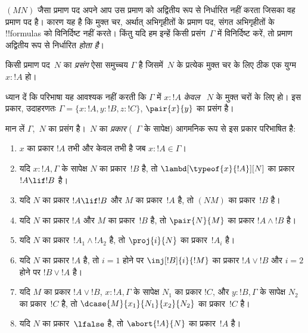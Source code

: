 \documentclass[../../../include/open-logic-section]{subfiles}
\begin{document}


$(MN)$ जैसा प्रमाण पद अपने आप उस प्रमाण को अद्वितीय रूप से निर्धारित नहीं
करता जिसका वह प्रमाण पद है। कारण यह है कि मुक्त चर, अर्थात् अभिगृहीतों के
प्रमाण पद, संगत अभिगृहीतों के !!{formula}s को विनिर्दिष्ट नहीं करते। किंतु यदि
हम इन्हें किसी प्रसंग~$\Gamma$ में विनिर्दिष्ट करें, तो प्रमाण अद्वितीय रूप से
निर्धारित \emph{होता है}।

\begin{defn}
किसी प्रमाण पद~$N$ का \emph{प्रसंग} ऐसा समुच्चय $\Gamma$ है जिसमें~$N$ के
प्रत्येक मुक्त चर के लिए ठीक एक युग्म $x : !A$ हो।
\end{defn}

ध्यान दें कि परिभाषा यह आवश्यक नहीं करती कि $\Gamma$ में $x:!A$ \emph{केवल}
~$N$ के मुक्त चरों के लिए हो। इस प्रकार, उदाहरणतः $\Gamma = \{x:!A, y:!B,
z:!C\}$, $\pair{x}{y}$ का प्रसंग है।

\begin{defn}
  मान लें $\Gamma$,~$N$ का प्रसंग है।~$N$ का \emph{प्रकार} (~$\Gamma$ के
  सापेक्ष) आगमनिक रूप से इस प्रकार परिभाषित है:
  \begin{enumerate}
  \item $x$ का प्रकार $!A$ तभी और केवल तभी है जब $x:!A \in \Gamma$।
  \item यदि $x:!A, \Gamma$ के सापेक्ष $N$ का प्रकार~$!B$ है, तो
  $\lambd[\typeof{x}{!A}][N]$ का प्रकार $!A \lif !B$ है।
  \item यदि $N$ का प्रकार $!A \lif !B$ और $M$ का प्रकार~$!A$ है, तो $(NM)$
  का प्रकार~$!B$ है।
  \item यदि $N$ का प्रकार $!A$ और $M$ का प्रकार~$!B$ है, तो $\pair{N}{M}$ का
  प्रकार $!A \land !B$ है।
  \item यदि $N$ का प्रकार~$!A_1 \land !A_2$ है, तो $\proj{i}{N}$ का
  प्रकार~$!A_i$ है।
  \item यदि $N$ का प्रकार $!A$ है, तो $i=1$ होने पर $\inj[!B]{i}{!M}$ का
  प्रकार $!A \lor !B$ और $i=2$ होने पर $!B \lor !A$ है।
  \item यदि $M$ का प्रकार $!A \lor !B$, $x:!A, \Gamma$ के सापेक्ष $N_1$ का
  प्रकार $!C$, और $y:!B, \Gamma$ के सापेक्ष $N_2$ का प्रकार~$!C$ है, तो
  $\dcase{M}{x_1}{N_1}{x_2}{N_2}$ का प्रकार~$!C$ है।
  \item यदि $N$ का प्रकार~$\lfalse$ है, तो $\abort{!A}{N}$ का प्रकार~$!A$ है।
  \end{enumerate}
\end{defn}
\end{document}
